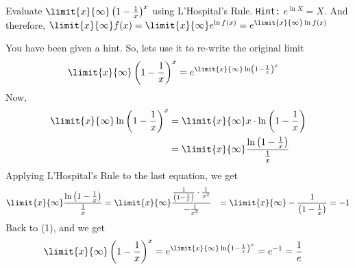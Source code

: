 

\question Evaluate $\limit{x}{\infty}\left( 1-\frac{1}{x}\right)^x$ using L'Hospital's Rule.
\texttt{Hint:} $e^{\ln X} = X$. And therefore, $\limit{x}{\infty}f(x) = \limit{x}{\infty}e^{\ln f(x)} 
= e^{\limit{x}{\infty}\ln f(x)}$

\insertQR{}

\ifprintanswers
\fi 

\begin{solution}
  You have been given a hint. So, lets use it to re-write the original limit 
  \begin{align}
    \limit{x}{\infty}\left( 1-\frac{1}{x} \right)^x &= e^{\limit{x}{\infty}\ln\left( 1-\frac{1}{x} \right)^x}
  \end{align}
  Now, 
  \begin{align}
    \limit{x}{\infty}\ln\left( 1-\frac{1}{x} \right)^x &= \limit{x}{\infty}x\cdot\ln\left( 1-\frac{1}{x}\right) \\
    &= \limit{x}{\infty}\dfrac{\ln\left(1-\frac{1}{x}\right)}{\frac{1}{x}}
  \end{align}
  Applying L'Hospital's Rule to the last equation, we get 
  \begin{align}
    \limit{x}{\infty}\dfrac{\ln\left(1-\frac{1}{x}\right)}{\frac{1}{x}} 
    &= \limit{x}{\infty}\dfrac{\frac{1}{\left( 1-\frac{1}{x}\right)}\cdot\frac{1}{x^2}}{-\frac{1}{x^2}}
    &= \limit{x}{\infty}-\dfrac{1}{\left( 1-\frac{1}{x}\right)} = -1
  \end{align}
  Back to (1), and we get 
  \begin{align}
    \limit{x}{\infty}\left( 1-\frac{1}{x} \right)^x 
    &= e^{\limit{x}{\infty}\ln\left( 1-\frac{1}{x} \right)^x} = e^{-1} = \dfrac{1}{e}
  \end{align}
\end{solution}

